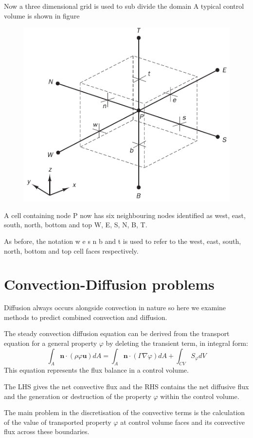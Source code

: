 \documentclass[a4paper, 15pt]{article}
\begin{document}
Now
a three dimensional grid is used to sub divide the domain A typical control volume is
shown in figure
\begin{figure}[H]
	\centering
	\includegraphics[width=0.4\linewidth]{fig/screenshot009}
	\label{fig:screenshot009}
\end{figure}

A
cell containing node P now has six neighbouring nodes identified as west, east, south, north,
bottom and top W, E, S, N, B, T.

As
before, the notation w e s n b and t is used to refer to the west, east, south, north, bottom
and top cell faces respectively. 

\section{Convection-Diffusion problems}

Diffusion
always occurs alongside convection in nature so here we examine methods to predict
combined convection and diffusion. 

The
steady convection diffusion equation can be derived from the transport equation for a
general property $\varphi$ by deleting the transient term, in integral form:
\[\int_A \textbf{n}\cdot(\rho\varphi\textbf{u})dA = \int_A\textbf{n}\cdot(\Gamma\nabla\varphi)dA + \int_{CV} S_{\varphi}dV\]
This
equation represents the flux balance in a control volume. \newline 

The LHS gives the net convective flux and the RHS contains the net diffusive
flux and the generation or destruction of the property $\varphi$ within the control volume. \newline 


\begin{tcolorbox}[colback=red!5!white,colframe=red!75!black,title=Take Home Message]
		The
	main problem in the discretisation of the convective terms is the calculation of the value of
	transported property $\varphi$ at control volume faces and its convective flux across these boundaries. 
\end{tcolorbox}
\end{document}
